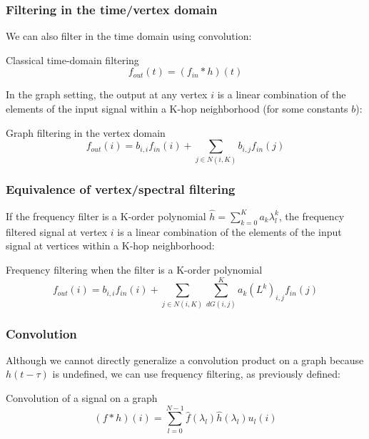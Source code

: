 \documentclass{beamer}
\begin{document}
\begin{frame}
  \frametitle{Filtering in the time/vertex domain}

  We can also filter in the time domain using convolution:

  \begin{block}{Classical time-domain filtering}
    \begin{equation}
      f_{out}(t) = (f_{in} * h)(t) 
    \end{equation}
  \end{block}

  In the graph setting, the output at any vertex $i$ is a linear combination of the elements of
  the input signal within a K-hop neighborhood (for some constants $b$):
  
  \begin{block}{Graph filtering in the vertex domain}
    \begin{equation}
      f_{out}(i) = b_{i,i} f_{in}(i) + \sum_{j \in N(i, K)} b_{i,j} f_{in}(j)
    \end{equation}
  \end{block}  
\end{frame}

\begin{frame}
  \frametitle{Equivalence of vertex/spectral filtering}
  If the frequency filter is a K-order polynomial $\hat{h} = \sum_{k=0}^K a_k
  \lambda_l^k$, the frequency filtered signal at vertex $i$ is a linear combination of the
  elements of the input signal at vertices within a K-hop neighborhood:

  \begin{block}{Frequency filtering when the filter is a K-order polynomial}
    \begin{equation}
      f_{out}(i) = b_{i,i} f_{in}(i) + \sum_{j \in N(i, K)} \sum_{d G(i,j)}^K a_k (L^k)_{i,j} f_{in}(j)
    \end{equation}
  \end{block}  
\end{frame}

\begin{frame}
  \frametitle{Convolution}

  Although we cannot directly generalize a convolution product on a graph
  because $h(t - \tau)$ is undefined, we can use frequency filtering, as
  previously defined:
  
  \begin{block}{Convolution of a signal on a graph}
    \begin{equation}
      (f * h)(i) = \sum_{l=0}^{N-1} \hat{f}(\lambda_l) \hat{h}(\lambda_l) u_l(i)
    \end{equation}
  \end{block}  
\end{frame}
\end{document}
